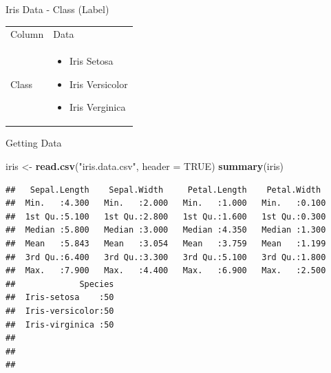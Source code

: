 \documentclass[ignorenonframetext,]{beamer}
\newenvironment{Shaded}{\begin{snugshade}}{\end{snugshade}}
\newcommand{\KeywordTok}[1]{\textcolor[rgb]{0.13,0.29,0.53}{\textbf{{#1}}}}
\newcommand{\DataTypeTok}[1]{\textcolor[rgb]{0.13,0.29,0.53}{{#1}}}
\newcommand{\StringTok}[1]{\textcolor[rgb]{0.31,0.60,0.02}{{#1}}}
\newcommand{\OtherTok}[1]{\textcolor[rgb]{0.56,0.35,0.01}{{#1}}}
\newcommand{\NormalTok}[1]{{#1}}
\providecommand{\tightlist}{%
\setlength{\itemsep}{0pt}\setlength{\parskip}{0pt}}
\begin{document}
\begin{frame}{Iris Data - Class (Label)}

\begin{longtable}[]{@{}ll@{}}
\toprule
\begin{minipage}[t]{0.12\columnwidth}\raggedright\strut
Column\strut
\end{minipage} & \begin{minipage}[t]{0.30\columnwidth}\raggedright\strut
Data\strut
\end{minipage}\tabularnewline
\begin{minipage}[t]{0.12\columnwidth}\raggedright\strut
Class\strut
\end{minipage} & \begin{minipage}[t]{0.30\columnwidth}\raggedright\strut
\begin{itemize}
\tightlist
\item
  Iris Setosa
\item
  Iris Versicolor
\item
  Iris Verginica
\end{itemize}\strut
\end{minipage}\tabularnewline
\bottomrule
\end{longtable}

\end{frame}

\begin{frame}[fragile]{Getting Data}

\begin{Shaded}
\begin{Highlighting}[]
\NormalTok{iris <-}\StringTok{ }\KeywordTok{read.csv}\NormalTok{(}\StringTok{"iris.data.csv"}\NormalTok{, }\DataTypeTok{header =} \OtherTok{TRUE}\NormalTok{)}
\KeywordTok{summary}\NormalTok{(iris)}
\end{Highlighting}
\end{Shaded}

\begin{verbatim}
##   Sepal.Length    Sepal.Width     Petal.Length    Petal.Width   
##  Min.   :4.300   Min.   :2.000   Min.   :1.000   Min.   :0.100  
##  1st Qu.:5.100   1st Qu.:2.800   1st Qu.:1.600   1st Qu.:0.300  
##  Median :5.800   Median :3.000   Median :4.350   Median :1.300  
##  Mean   :5.843   Mean   :3.054   Mean   :3.759   Mean   :1.199  
##  3rd Qu.:6.400   3rd Qu.:3.300   3rd Qu.:5.100   3rd Qu.:1.800  
##  Max.   :7.900   Max.   :4.400   Max.   :6.900   Max.   :2.500  
##             Species  
##  Iris-setosa    :50  
##  Iris-versicolor:50  
##  Iris-virginica :50  
##                      
##                      
## 
\end{verbatim}

\end{frame}
\end{document}

